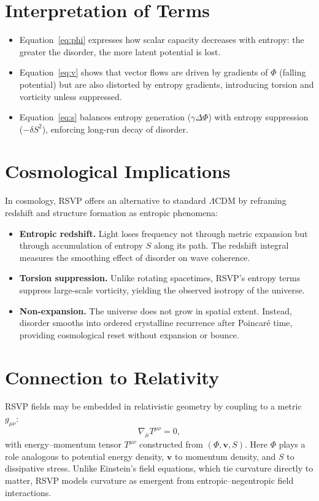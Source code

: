 \documentclass[a4paper,11pt,openany]{book}
\begin{document}
\section{Interpretation of Terms}

\begin{itemize}
  \item Equation~\eqref{eq:phi} expresses how scalar capacity decreases with entropy: the 
  greater the disorder, the more latent potential is lost.
  \item Equation~\eqref{eq:v} shows that vector flows are driven by gradients of $\Phi$ 
  (falling potential) but are also distorted by entropy gradients, introducing torsion and 
  vorticity unless suppressed.
  \item Equation~\eqref{eq:s} balances entropy generation ($\gamma\Delta \Phi$) with entropy 
  suppression ($-\delta S^2$), enforcing long-run decay of disorder.
\end{itemize}

\section{Cosmological Implications}

In cosmology, RSVP offers an alternative to standard $\Lambda$CDM by reframing redshift and 
structure formation as entropic phenomena:
\begin{itemize}
  \item \textbf{Entropic redshift.} Light loses frequency not through metric expansion but 
  through accumulation of entropy $S$ along its path. The redshift integral measures the 
  smoothing effect of disorder on wave coherence.
  \item \textbf{Torsion suppression.} Unlike rotating spacetimes, RSVP’s entropy terms 
  suppress large-scale vorticity, yielding the observed isotropy of the universe.
  \item \textbf{Non-expansion.} The universe does not grow in spatial extent. Instead, 
  disorder smooths into ordered crystalline recurrence after Poincaré time, providing 
  cosmological reset without expansion or bounce.
\end{itemize}

\section{Connection to Relativity}

RSVP fields may be embedded in relativistic geometry by coupling to a metric $g_{\mu\nu}$:
\[
\nabla_\mu T^{\mu\nu} = 0,
\]
with energy–momentum tensor $T^{\mu\nu}$ constructed from $(\Phi,\mathbf{v},S)$.  
Here $\Phi$ plays a role analogous to potential energy density, $\mathbf{v}$ to 
momentum density, and $S$ to dissipative stress. Unlike Einstein’s field equations, which 
tie curvature directly to matter, RSVP models curvature as emergent from entropic–negentropic 
field interactions.
\end{document}
